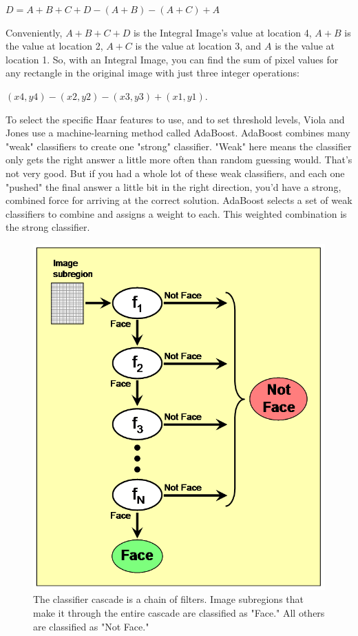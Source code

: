 \documentclass[12pt]{article}			%
\begin{document}
\begin{center}
  $D = A+B+C+D -  (A+B) -  (A+C) + A$
\end{center}
Conveniently, $A+B+C+D$ is the Integral Image's value at location 4, $A+B$ is the value at location 2, $A+C$ is the value at location 3, and $A$ is the value at location 1. So, with an Integral Image, you can find the sum of pixel values for any rectangle in the original image with just three integer operations:
\begin{center}
\(
\left(x4, y4\right) - \left(x2, y2\right) - \left(x3, y3\right) + \left(x1, y1\right)
\).
\end{center}
To select the specific Haar features to use, and to set threshold levels, Viola and Jones use a machine-learning method called AdaBoost. AdaBoost combines many "weak" classifiers to create one "strong" classifier. "Weak" here means the classifier only gets the right answer a little more often than random guessing would. That's not very good. But if you had a whole lot of these weak classifiers, and each one "pushed" the final answer a little bit in the right direction, you'd have a strong, combined force for arriving at the correct solution. AdaBoost selects a set of weak classifiers to combine and assigns a weight to each. This weighted combination is the strong classifier.\\
\begin{figure}[h]
	\centering
	\includegraphics[scale=0.4]{img/fd4.png}
	\caption{\small The classifier cascade is a chain of filters. Image subregions that make it through the entire cascade are classified as "Face." All others are classified as "Not Face."}
	\label{fig:fd3}
\end{figure}
\end{document}
